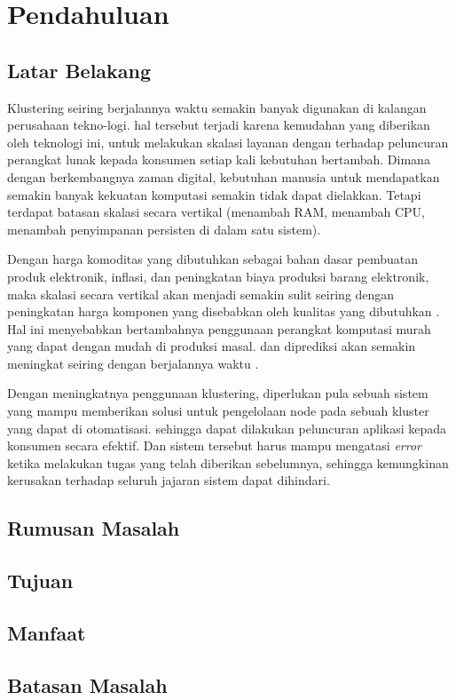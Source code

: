 \section{Pendahuluan}
\subsection{Latar Belakang}
Klustering seiring berjalannya waktu semakin banyak digunakan di kalangan perusahaan tekno-logi. hal tersebut terjadi karena kemudahan yang diberikan oleh teknologi ini, untuk melakukan skalasi layanan dengan terhadap peluncuran perangkat lunak kepada konsumen setiap kali kebutuhan bertambah. Dimana dengan berkembangnya zaman digital, kebutuhan manusia untuk mendapatkan semakin banyak kekuatan komputasi semakin tidak dapat dielakkan. Tetapi terdapat batasan skalasi secara vertikal (menambah RAM, menambah CPU, menambah penyimpanan persisten di dalam satu sistem).

\vspace{0.2cm}
\noindent Dengan harga komoditas yang dibutuhkan sebagai bahan dasar pembuatan produk elektronik, inflasi, dan peningkatan biaya produksi barang elektronik, maka skalasi secara vertikal akan menjadi semakin sulit seiring dengan peningkatan harga komponen yang disebabkan oleh kualitas yang dibutuhkan \cite{electronic_cost}. Hal ini menyebabkan bertambahnya penggunaan perangkat komputasi murah yang dapat dengan mudah di produksi masal. dan diprediksi akan semakin meningkat seiring dengan berjalannya waktu \cite{raspi_market}.

\vspace{0.2cm}
\noindent Dengan meningkatnya penggunaan klustering, diperlukan pula sebuah sistem yang mampu memberikan solusi untuk pengelolaan node pada sebuah kluster yang dapat di otomatisasi. sehingga dapat dilakukan peluncuran aplikasi kepada konsumen secara efektif. Dan sistem tersebut harus mampu mengatasi \textit{error} ketika melakukan tugas yang telah diberikan sebelumnya, sehingga kemungkinan kerusakan terhadap seluruh jajaran sistem dapat dihindari.


\subsection{Rumusan Masalah}

\subsection{Tujuan}

\subsection{Manfaat}

\subsection{Batasan Masalah}